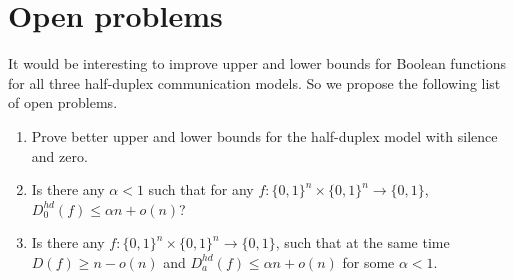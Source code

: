 \section{Open problems}\label{sec:open-questions}
It would be interesting to improve upper and lower bounds for Boolean functions 
for all three half-duplex communication models.
So we propose the following list of open problems.
\begin{enumerate}
\item Prove better upper and lower bounds for the half-duplex model with silence and zero.

\item Is there any $\alpha < 1$ such that for any $f:\{0,1\}^n\times\{0,1\}^n\to\{0,1\}$, $D^{hd}_0(f)\le \alpha n + o(n)$?

\item Is there any $f:\{0,1\}^n\times\{0,1\}^n\to\{0,1\}$, such that at the same time $D(f) \ge n - o(n)$ and $D^{hd}_a(f)\le \alpha n + o(n)$ for some $\alpha<1$.
\end{enumerate}
